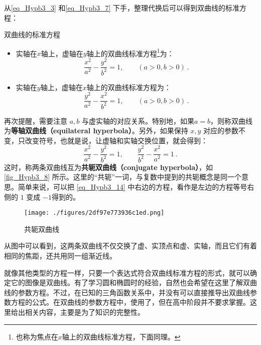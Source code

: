 从\autoref{eq_Hypb3_3} 和\autoref{eq_Hypb3_7} 下手，整理代换后可以得到双曲线的标准方程：

\begin{theorem}{双曲线的标准方程}
\begin{itemize}
\item 实轴在$x$轴上，虚轴在$y$轴上的双曲线标准方程\footnote{也称为焦点在$x$轴上的双曲线标准方程，下面同理。}为：
\begin{equation}\label{eq_Hypb3_4}
\frac{x^2}{a^2} - \frac{y^2}{b^2} = 1,\qquad(a>0,b>0)~.
\end{equation}
\item 实轴在$y$轴上，虚轴在$x$轴上的双曲线标准方程为：
\begin{equation}
\frac{y^2}{a^2} -\frac{x^2}{b^2}  = 1,\qquad(a>0,b>0)~.
\end{equation}
\end{itemize}
\end{theorem}

再次提醒，需要注意 $a,b$ 与虚实轴的对应关系。特别地，如果$a=b$，则称双曲线为\textbf{等轴双曲线（equilateral hyperbola）}。另外，如果保持 $x,y$ 对应的参数不变，只改变符号，也就是说，让虚轴和实轴交换位置，就会得到：
\begin{equation}\label{eq_Hypb3_14}
\frac{x^2}{a^2} - \frac{y^2}{b^2} = 1,\qquad \frac{y^2}{b^2} - \frac{x^2}{a^2} = 1 ~.
\end{equation}
这时，称两条双曲线互为\textbf{共轭双曲线（conjugate hyperbola）}，如\autoref{fig_Hypb3_8} 所示。这里的“共轭”一词，与复数中提到的共轭概念是同一个意思。简单来说，可以把 \autoref{eq_Hypb3_14} 中右边的方程，看作是左边的方程等号右侧的 $1$ 变成 $-1$得到的。
\begin{figure}[ht]
\centering
\texttt{[image: ./figures/2df97e773936c1ed.png]}
\caption{共轭双曲线} \label{fig_Hypb3_8}
\end{figure}
从图中可以看到，这两条双曲线不仅交换了虚、实顶点和虚、实轴，而且它们有着相同的焦距，还共用同一组渐近线。

就像其他类型的方程一样，只要一个表达式符合双曲线标准方程的形式，就可以确定它的图像是双曲线。有了学习圆和椭圆时的经验，自然也会希望在这里了解双曲线的参数方程。不过，在已知的三角函数关系中，并没有可以直接推导出双曲线参数方程的公式。在双曲线的参数方程中，使用了，但在高中阶段并不要求掌握。这里给出相关内容，主要是为了知识的完整性。

